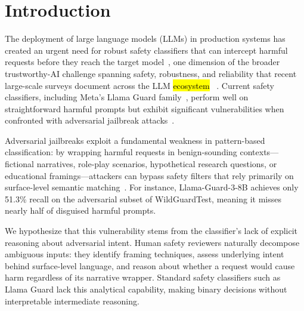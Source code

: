 \documentclass[superintelligence,article,accept,moreauthors]{Definitions/mdpi}
\begin{document}

\section{Introduction}

The deployment of large language models (LLMs) in production systems has created an urgent need for robust safety classifiers that can intercept harmful requests before they reach the target model~\citep{inan2023llamaguard, han2024wildguard}, one dimension of the broader trustworthy-AI challenge spanning safety, robustness, and reliability that recent large-scale surveys document across the LLM \hl{ecosystem}
~\citep{sun2024trustllm}. Current safety classifiers, including Meta's Llama Guard \mbox{family~\citep{inan2023llamaguard, metallamaguard3},} perform well on straightforward harmful prompts but exhibit significant vulnerabilities when confronted with adversarial jailbreak attacks~\citep{chao2023jailbreaking, zou2023universal, liu2024autodan}.

Adversarial jailbreaks exploit a fundamental weakness in pattern-based classification: by wrapping harmful requests in benign-sounding contexts---fictional narratives, role-play scenarios, hypothetical research questions, or educational framings---attackers can bypass safety filters that rely primarily on surface-level semantic matching~\citep{wei2024jailbroken}. For instance, Llama-Guard-3-8B achieves only 51.3\% recall on the adversarial subset of WildGuardTest, meaning it misses nearly half of disguised harmful prompts.

We hypothesize that this vulnerability stems from the classifier's lack of explicit reasoning about adversarial intent. Human safety reviewers naturally decompose ambiguous inputs: they identify framing techniques, assess underlying intent behind surface-level language, and reason about whether a request would cause harm regardless of its narrative wrapper. Standard safety classifiers such as Llama Guard lack this analytical capability, making binary decisions without interpretable intermediate reasoning.
\end{document}
